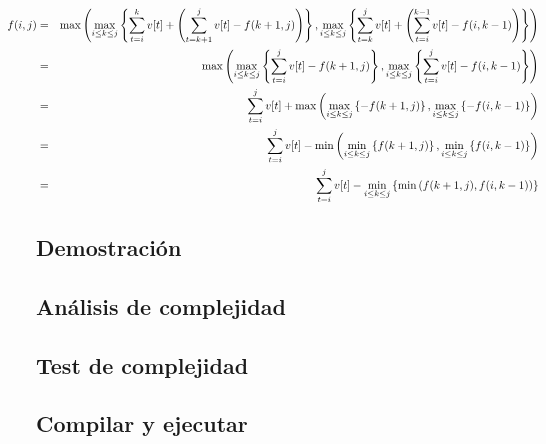 \begin{eqnarray*}\hspace*{-4cm}
  f(i,j) &=& \max\left( 
      \max_{i \leq k \leq j}\left\{ \sum_{t=i}^k v[t] + \left( \sum_{t=k+1}^{j} v[t] - f(k+1,j) \right) \right\},  
      \max_{i \leq k \leq j}\left\{ \sum_{t=k}^j v[t] + \left( \sum_{t=i}^{k-1} v[t] - f(i,k-1) \right) \right\} 
    \right) \\
    &=& \max \left(
      \max_{i \leq k \leq j}\left\{ \sum_{t=i}^j v[t] - f(k+1,j) \right\},  
      \max_{i \leq k \leq j}\left\{ \sum_{t=i}^j v[t] - f(i,k-1) \right\} 
    \right) \\
    &=& \sum_{t=i}^j v[t] + \max \left(
      \max_{i \leq k \leq j}\left\{ - f(k+1,j) \right\},  
      \max_{i \leq k \leq j}\left\{ - f(i,k-1) \right\} 
    \right) \\
    &=& \sum_{t=i}^j v[t] - \min \left(
      \min_{i \leq k \leq j}\left\{ f(k+1,j) \right\},  
      \min_{i \leq k \leq j}\left\{ f(i,k-1) \right\} 
    \right) \\
    &=& \sum_{t=i}^j v[t] - \min_{i \leq k \leq j}\left\{ \min \left( f(k+1,j), f(i,k-1) \right) \right\} 
\end{eqnarray*}


\subsection{Demostraci\'on}

\subsection{An\'alisis de complejidad}

\subsection{Test de complejidad}

\subsection{Compilar y ejecutar}
